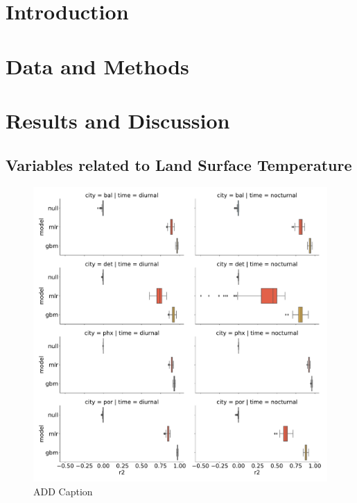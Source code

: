 \documentclass[]{elsarticle}
\begin{document}
\linenumbers

\section{Introduction}


\section{Data and Methods}


\section{Results and Discussion}

\subsection{Variables related to Land Surface Temperature}


\begin{figure}[h]
\begin{center}
\includegraphics[width=\textwidth]{fig/report/holdout_results_r2.pdf}
\caption{ADD Caption}
\label{fig:cityholdout_errors}
\end{center}
\end{figure}
\end{document}
